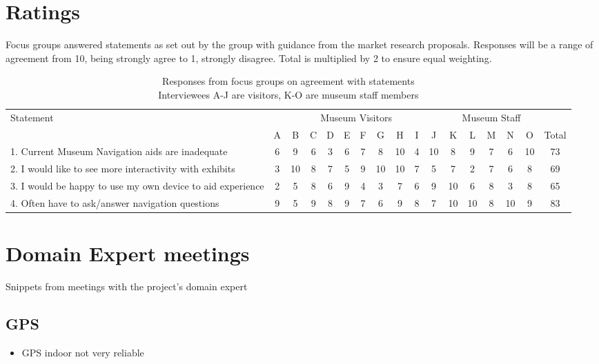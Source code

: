 \section*{Ratings}
Focus groups answered statements as set out by the group with guidance from the market research proposals. Responses will be a range of agreement from 10, being strongly agree to 1, strongly disagree. Total is multiplied by 2 to ensure equal weighting.

\begin{sidewaystable}
\renewcommand{\arraystretch}{1.5}
\begin{table}[H]
\centering
\begin{tabular}{ | p{5cm} | c | c | c | c | c | c | c | c | c | c | c | c | c | c | c | c | }
\toprule
	Statement &  \multicolumn{10}{c}{Museum Visitors} & \multicolumn{5}{c}{Museum Staff}\\

	 & A & B & C & D & E & F & G & H & I & J & K & L & M & N & O & Total \\ 
	\midrule
	1. Current Museum Navigation aids are inadequate & 6 & 9 & 6 & 3 & 6 & 7 & 8 & 10 & 4 & 10 & 8 & 9 & 7 & 6 & 10 & 73 \\ \hline
	2. I would like to see more interactivity with exhibits & 3 & 10 & 8 & 7 & 5 & 9 & 10 & 10 & 7 & 5 & 7 & 2 & 7 & 6 & 8 & 69 \\ \hline
	3. I would be happy to use my own device to aid experience & 2 & 5 & 8 & 6 & 9 & 4 & 3 & 7 & 6 & 9 & 10 & 6 & 8 & 3 & 8 & 65 \\ \hline
	4. Often have to ask/answer navigation questions & 9 & 5 & 9 & 8 & 9 & 7 & 6 & 9 & 8 & 7 & 10 & 10 & 8 & 10 & 9 & 83 \\
\bottomrule
\end{tabular}
\caption{Responses from focus groups on agreement with statements \\ Interviewees A-J are visitors, K-O are museum staff members}
\label{table:fgresponseratings}
\end{table}
\end{sidewaystable}

\newpage
\section*{Domain Expert meetings}
Snippets from meetings with the project's domain expert
\subsection*{GPS}
\begin{itemize}
	\item GPS indoor not very reliable
\end{itemize}

